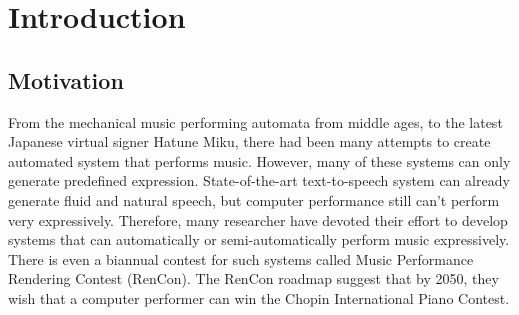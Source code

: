 \chapter{Introduction}
\section{Motivation}
From the mechanical music performing automata from middle ages, to the latest Japanese virtual signer Hatune Miku, there had been many attempts to create automated system that performs music. However, many of these systems can only generate predefined expression. State-of-the-art text-to-speech system can already generate fluid and natural speech, but computer performance still can't perform very expressively. Therefore, many researcher have devoted their effort to develop systems that can automatically or semi-automatically perform music expressively. There is even a biannual contest for such systems called Music Performance Rendering Contest (RenCon)\cite{RenCon}. The RenCon roadmap suggest that by 2050, they wish that a computer performer can win the Chopin International Piano Contest.


